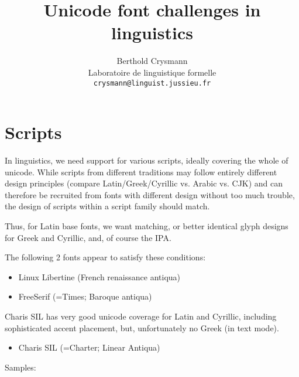 \documentclass[12pt,a4paper]{article}
\title{Unicode font challenges in linguistics}
\author{Berthold Crysmann\\[1ex]
   Laboratoire de linguistique formelle\\
 \texttt{crysmann@linguist.jussieu.fr}}
\date{}
\begin{document}
\maketitle

\section{Scripts}

\begin{sloppypar}
  In linguistics, we need support for various scripts, ideally
  covering the whole of unicode. While scripts from different
  traditions may follow entirely different design principles (compare
  Latin/Greek/Cyrillic vs. Arabic vs. CJK) and can therefore be
  recruited from fonts with different design without too much trouble,
  the design of scripts within a script family should match.
\end{sloppypar}
Thus, for Latin base fonts, we want matching, or better identical
glyph designs for Greek and Cyrillic, and, of course the IPA. 

The following 2 fonts appear to satisfy these conditions: 

\begin{itemize}
\item Linux Libertine (French renaissance antiqua)
\item FreeSerif (=Times; Baroque antiqua)
\end{itemize}

Charis SIL has very good unicode coverage for Latin and Cyrillic,
including sophisticated accent placement, but, unfortunately no Greek
(in text mode). 

\begin{itemize}
\item Charis SIL (=Charter; Linear Antiqua)
\end{itemize}

Samples:
\end{document}
